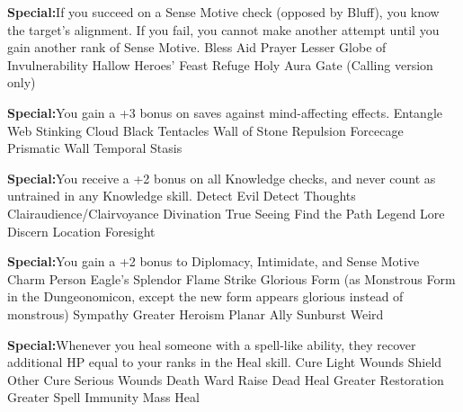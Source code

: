 \textbf{Special:}{If you succeed on a Sense Motive check (opposed by Bluff), you know the target's alignment. If you fail, you cannot make another attempt until you gain another rank of Sense Motive.}
\sphere
{Bless}
{Aid}
{Prayer}
{Lesser Globe of Invulnerability}
{Hallow}
{Heroes' Feast}
{Refuge}
{Holy Aura}
{Gate (Calling version only)}

\textbf{Special:}{You gain a +3 bonus on saves against mind-affecting effects.}
\sphere
{Entangle}
{Web}
{Stinking Cloud}
{Black Tentacles}
{Wall of Stone}
{Repulsion}
{Forcecage}
{Prismatic Wall}
{Temporal Stasis}

\textbf{Special:}{You receive a +2 bonus on all Knowledge checks, and never count as untrained in any Knowledge skill.}
\sphere
{Detect Evil}
{Detect Thoughts}
{Clairaudience/Clairvoyance}
{Divination}
{True Seeing}
{Find the Path}
{Legend Lore}
{Discern Location}
{Foresight}

\textbf{Special:}{You gain a +2 bonus to Diplomacy, Intimidate, and Sense Motive}
\sphere
{Charm Person}
{Eagle's Splendor}
{Flame Strike}
{Glorious Form (as Monstrous Form in the Dungeonomicon, except the new form appears glorious instead of monstrous)}
{Sympathy}
{Greater Heroism}
{Planar Ally}
{Sunburst}
{Weird}

\textbf{Special:}{Whenever you heal someone with a spell-like ability, they recover additional HP equal to your ranks in the Heal skill.}
\sphere
{Cure Light Wounds}
{Shield Other}
{Cure Serious Wounds}
{Death Ward}
{Raise Dead}
{Heal}
{Greater Restoration}
{Greater Spell Immunity}
{Mass Heal}
